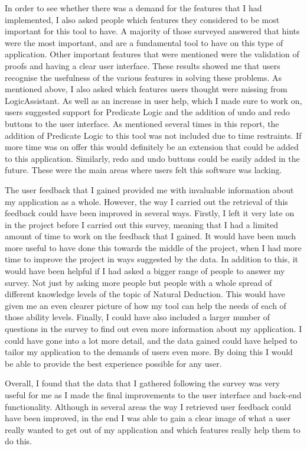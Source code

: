 In order to see whether there was a demand for the features that I had implemented, I also asked people which features they considered to be most important for this tool to have. A majority of those surveyed answered that hints were the most important, and are a fundamental tool to have on this type of application. Other important features that were mentioned were the validation of proofs and having a clear user interface. These results showed me that users recognise the usefulness of the various features in solving these problems. As mentioned above, I also asked which features users thought were missing from LogicAssistant. As well as an increase in user help, which I made sure to work on, users suggested support for Predicate Logic and the addition of undo and redo buttons to the user interface. As mentioned several times in this report, the addition of Predicate Logic to this tool was not included due to time restraints. If more time was on offer this would definitely be an extension that could be added to this application. Similarly, redo and undo buttons could be easily added in the future. These were the main areas where users felt this software was lacking.

The user feedback that I gained provided me with invaluable information about my application as a whole. However, the way I carried out the retrieval of this feedback could have been improved in several ways. Firstly, I left it very late on in the project before I carried out this survey, meaning that I had a limited amount of time to work on the feedback that I gained. It would have been much more useful to have done this towards the middle of the project, when I had more time to improve the project in ways suggested by the data. In addition to this, it would have been helpful if I had asked a bigger range of people to answer my survey. Not just by asking more people but people with a whole spread of different knowledge levels of the topic of Natural Deduction. This would have given me an even clearer picture of how my tool can help the needs of each of those ability levels. Finally, I could have also included a larger number of questions in the survey to find out even more information about my application. I could have gone into a lot more detail, and the data gained could have helped to tailor my application to the demands of users even more. By doing this I would be able to provide the best experience possible for any user.

Overall, I found that the data that I gathered following the survey was very useful for me as I made the final improvements to the user interface and back-end functionality. Although in several areas the way I retrieved user feedback could have been improved, in the end I was able to gain a clear image of what a user really wanted to get out of my application and which features really help them to do this. 


